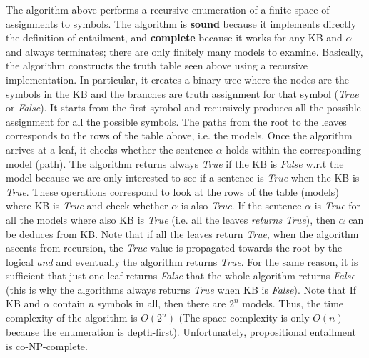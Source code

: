 The algorithm above performs a recursive enumeration of a finite space of assignments to symbols. The algorithm is \textbf{sound} because it implements directly the definition of entailment, and \textbf{complete} because it works for any KB and $\alpha$ and always terminates; there are only finitely many models to examine.\newline\newline
Basically, the algorithm constructs the truth table seen above using a recursive implementation. In particular, it creates a binary tree where the nodes are the symbols in the KB and the branches are truth assignment for that symbol (\textit{True} or \textit{False}). It starts from the first symbol and recursively produces all the possible assignment for all the possible symbols. The paths from the root to the leaves corresponds to the rows of the table above, i.e. the models. Once the algorithm arrives at a leaf, it checks whether the sentence $\alpha$ holds within the corresponding model (path). The algorithm returns always \textit{True} if the KB is \textit{False} w.r.t the model because we are only interested to see if a sentence is \textit{True} when the KB is \textit{True}. These operations correspond to look at the rows of the table (models) where KB is \textit{True} and check whether $\alpha$ is also \textit{True}. If the sentence $\alpha$ is \textit{True} for all the models where also KB is \textit{True} (i.e. all the leaves \textit{returns} \textit{True}), then $\alpha$ can be deduces from KB. Note that if all the leaves return \textit{True}, when the algorithm ascents from recursion, the \textit{True} value is propagated towards the root by the logical \textit{and} and eventually the algorithm returns \textit{True}.  For the same reason, it is sufficient that just one leaf returns \textit{False} that the whole algorithm returns \textit{False} (this is why the algorithms always returns \textit{True} when KB is \textit{False}).\newline\newline
Note that If KB and $\alpha$ contain $n$ symbols in all, then there are $2^n$ models. Thus, the time complexity of the algorithm is $O(2^n)$ (The space complexity is only $O(n)$ because the enumeration is depth-first). Unfortunately, propositional entailment is co-NP-complete.
